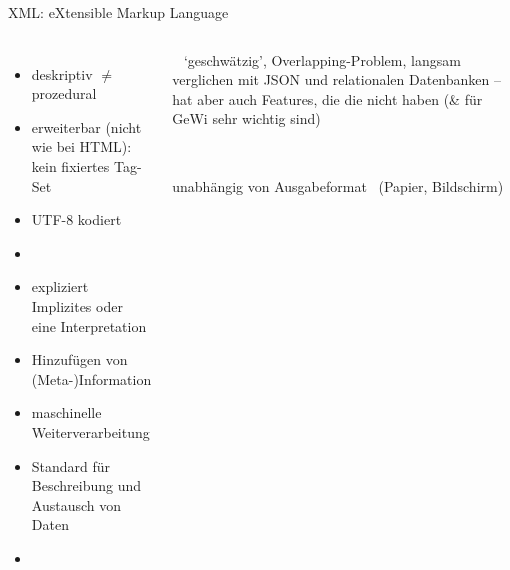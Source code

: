 \begin{frame}{XML: eXtensible Markup Language}
\begin{columns}
\footnotesize
\begin{itemize}
    \item deskriptiv $\neq$ prozedural \item erweiterbar (nicht wie bei HTML): kein fixiertes Tag-Set \item UTF-8 kodiert
    \item {}
     \item expliziert Implizites oder eine Interpretation \item Hinzufügen von (Meta-)Information \item maschinelle Weiterverarbeitung 
     \item Standard für Beschreibung und Austausch von Daten 
     \item {}
\end{itemize}
\footnotesize
\begin{block}{}
~  `geschwätzig', Overlapping-Problem, langsam verglichen mit JSON und relationalen Datenbanken -- hat aber auch Features, die die nicht haben (\& für GeWi sehr wichtig sind)
\medskip

~ 
\medskip

{unabhängig von Ausgabeformat}~ (Papier, Bildschirm)
\end{block}
\end{columns}


\end{frame}


